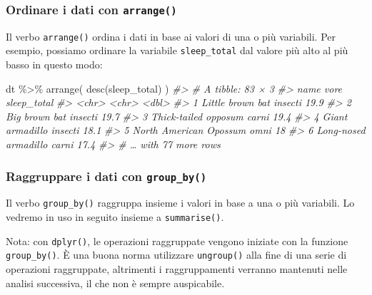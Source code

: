\documentclass[
  10pt,
  italian,
  a4paper,
  extrafontsizes,onecolumn,openright
  ]{memoir}
\newenvironment{Shaded}{\begin{snugshade}}{\end{snugshade}}
\newcommand{\CommentTok}[1]{\textcolor[rgb]{0.56,0.35,0.01}{\textit{#1}}}
\newcommand{\FunctionTok}[1]{\textcolor[rgb]{0.00,0.00,0.00}{#1}}
\newcommand{\NormalTok}[1]{#1}
\newcommand{\SpecialCharTok}[1]{\textcolor[rgb]{0.00,0.00,0.00}{#1}}
\begin{document}
\hypertarget{ordinare-i-dati-con-arrange}{%
\subsubsection{\texorpdfstring{Ordinare i dati con \texttt{arrange()}}{Ordinare i dati con arrange()}}\label{ordinare-i-dati-con-arrange}}

Il verbo \texttt{arrange()} ordina i dati in base ai valori di una o più variabili. Per esempio, possiamo ordinare la variabile \texttt{sleep\_total} dal valore più alto al più basso in questo modo:

\begin{Shaded}
\begin{Highlighting}[]
\NormalTok{dt }\SpecialCharTok{\%\textgreater{}\%} 
  \FunctionTok{arrange}\NormalTok{(}
    \FunctionTok{desc}\NormalTok{(sleep\_total)}
\NormalTok{  )}
\CommentTok{\#\textgreater{} \# A tibble: 83 × 3}
\CommentTok{\#\textgreater{}   name                   vore    sleep\_total}
\CommentTok{\#\textgreater{}   \textless{}chr\textgreater{}                  \textless{}chr\textgreater{}         \textless{}dbl\textgreater{}}
\CommentTok{\#\textgreater{} 1 Little brown bat       insecti        19.9}
\CommentTok{\#\textgreater{} 2 Big brown bat          insecti        19.7}
\CommentTok{\#\textgreater{} 3 Thick{-}tailed opposum   carni          19.4}
\CommentTok{\#\textgreater{} 4 Giant armadillo        insecti        18.1}
\CommentTok{\#\textgreater{} 5 North American Opossum omni           18  }
\CommentTok{\#\textgreater{} 6 Long{-}nosed armadillo   carni          17.4}
\CommentTok{\#\textgreater{} \# … with 77 more rows}
\end{Highlighting}
\end{Shaded}

\hypertarget{raggruppare-i-dati-con-group_by}{%
\subsubsection{\texorpdfstring{Raggruppare i dati con \texttt{group\_by()}}{Raggruppare i dati con group\_by()}}\label{raggruppare-i-dati-con-group_by}}

Il verbo \texttt{group\_by()} raggruppa insieme i valori in base a una o più variabili. Lo vedremo in uso in seguito insieme a \texttt{summarise()}.

Nota: con \texttt{dplyr()}, le operazioni raggruppate vengono iniziate con la funzione \texttt{group\_by()}. È una buona norma utilizzare \texttt{ungroup()} alla fine di una serie di operazioni raggruppate, altrimenti i raggruppamenti verranno mantenuti nelle analisi successiva, il che non è sempre auspicabile.
\end{document}
